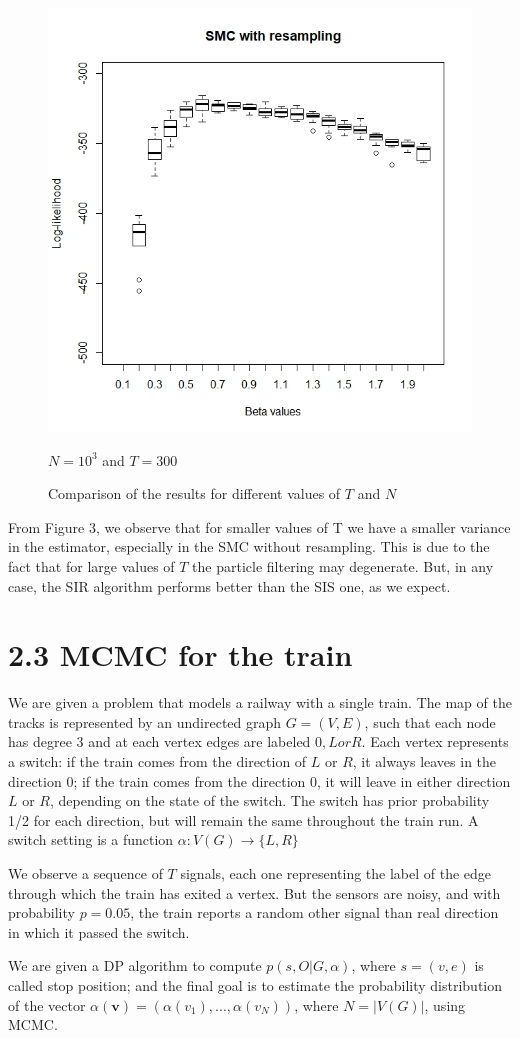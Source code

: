 \documentclass[]{article}
\begin{document}
\begin{figure}
\begin{center}
		\includegraphics[width=.4\textwidth]{task1/SIR_N_1000_T_300.jpeg}
		\caption*{$N=10^3$ and $T=300$}
	\end{center}
	\caption{Comparison of the results for different values of $T$ and $N$}
\end{figure}

From Figure 3, we observe that for smaller values of T we have a smaller variance in the estimator, especially in the SMC without resampling. This is due to the fact that for large values of $T$ the particle filtering may degenerate. But, in any case, the SIR algorithm performs better than the SIS one, as we expect. 

\newpage

\section*{2.3 MCMC for the train}
We are given a problem that models a railway with a single train. The map of the tracks is represented by an undirected graph $G=(V,E)$, such that each node has degree 3 and at each vertex edges are labeled $0, L or R$. Each vertex represents a switch: if the train comes from the direction of $L$ or $R$, it always leaves in the direction 0; if the train comes from the direction $0$, it will leave in either direction $L$ or $R$, depending on the state of the switch. The switch has prior probability 1/2 for each direction, but will remain the same throughout the train run. A switch setting is a function $\alpha : V(G) \rightarrow \{L,R\}$

We observe a sequence of $T$ signals, each one representing the label of the edge through which the train has exited a vertex. But the sensors are noisy, and with probability $p = 0.05$, the train reports a random other signal than real direction in which it passed the switch. 

We are given a DP algorithm to compute $p(s,O|G,\alpha)$, where $s=(v,e)$ is called stop position; and the final goal is to estimate the probability distribution of the vector $\alpha(\mathbf{v}) = (\alpha(v_1), ..., \alpha(v_N))$,  where $ N=|V(G)| $, using MCMC.
\end{document}
